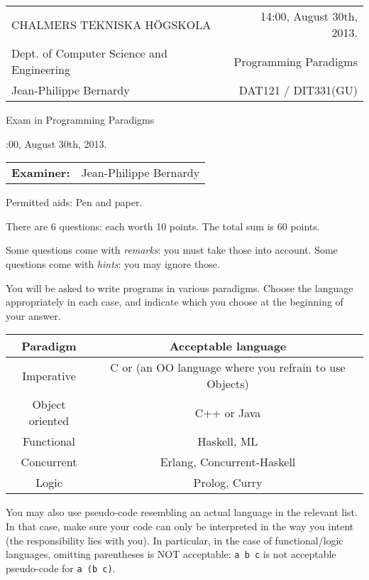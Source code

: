 \documentclass{article}
\begin{document}
\setlength{\parskip}{2pt}

\newcommand{\examtime}{14:00, August 30th, 2013}
\newcommand{\points}[1]{\marginpar{\bf #1 points}}
\noindent
\begin{tabular}{lr}
CHALMERS TEKNISKA H\"OGSKOLA &\examtime{}.\\
Dept. of Computer Science and Engineering & Programming Paradigms\\
Jean-Philippe Bernardy                 & DAT121 / DIT331(GU) \\
\end{tabular}

\vspace{2.5cm} \noindent
\begin{center} {\LARGE
Exam in Programming Paradigms}
\end{center}

\vspace{1.5cm}

\noindent
\examtime{}.\\
\begin{tabular}{ll}
\textbf{Examiner:} & Jean-Philippe Bernardy
\end{tabular}
\vspace{1cm}

\noindent
Permitted aids: Pen and paper.

There are 6 questions: each worth 10 points. The total sum is 60
points.

Some questions come with \emph{remarks}: you must take those
into account.  
Some questions come with \emph{hints}: you may ignore those.

You will be asked to write programs in various paradigms. Choose the
language appropriately in each case, and indicate which you choose at
the beginning of your answer.

\begin{tabular}[p]{cc}
  Paradigm & Acceptable language \\ \hline
  Imperative   & C or (an OO language where you refrain to use Objects) \\
  Object oriented & C++ or Java \\
  Functional & Haskell, ML \\
  Concurrent & Erlang, Concurrent-Haskell \\
  Logic & Prolog, Curry
\end{tabular}

You may also use pseudo-code resembling an actual language in the
relevant list. In that case, make sure your code can only be
interpreted in the way you intent (the responsibility lies with
you). In particular, in the case of functional/logic languages,
omitting parentheses is NOT acceptable: \texttt{a b c} is not
acceptable pseudo-code for \texttt{a (b c)}.
\end{document}
